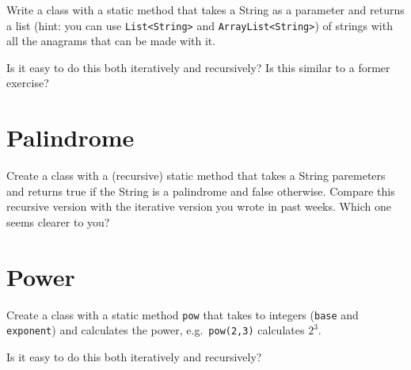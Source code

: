 \documentclass{article}
\begin{document}
Write a class with a static method that takes a String as a parameter
and returns a list (hint: you can use \verb+List<String>+ and
\verb+ArrayList<String>+) of strings with all the anagrams that can be
made with it. 

Is it easy to do this both iteratively and recursively? Is this
similar to a former exercise?

\section{Palindrome}
\label{sec:palindrome}

Create a class with a (recursive) static method that takes a String
paremeters and
returns true if the String is a palindrome and false
otherwise. Compare this recursive version with the iterative version
you wrote in past weeks. Which one seems clearer to you?

\section{Power}
\label{sec:power}

Create a class with a static method \verb+pow+ that takes to integers
(\verb+base+ and \verb+exponent+) and calculates the power, 
e.g.~\verb+pow(2,3)+ calculates $2^3$. 

Is it easy to do this both iteratively and recursively? 





\end{document}
